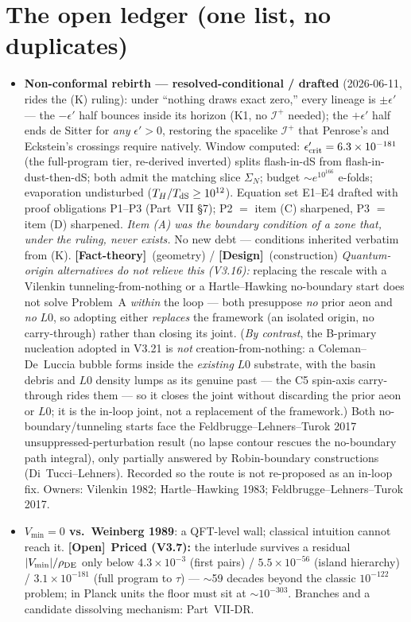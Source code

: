 \documentclass[11pt]{article}
\newcommand{\factth}{\textcolor{green!40!black}{\textbf{[Fact-theory]}}}
\newcommand{\design}{\textcolor{blue!60!black}{\textbf{[Design]}}}
\newcommand{\open}{\textcolor{red!70!black}{\textbf{[Open]}}}
\begin{document}
\section{The open ledger (one list, no duplicates)}
\begin{itemize}[leftmargin=2.6em,itemsep=3pt]
\item[\textbf{(A)}] \textbf{Non-conformal rebirth --- resolved-conditional / drafted} (2026-06-11, rides the (K) ruling): under ``nothing draws exact zero,'' every lineage is $\pm\epsilon'$ --- the $-\epsilon'$ half bounces inside its horizon (K1, no $\mathscr I^+$ needed); the $+\epsilon'$ half ends de Sitter for \emph{any} $\epsilon'>0$, restoring the spacelike $\mathscr I^+$ that Penrose's and Eckstein's crossings require natively. Window computed: $\epsilon'_{\rm crit}=6.3\times10^{-181}$ (the full-program tier, re-derived inverted) splits flash-in-dS from flash-in-dust-then-dS; both admit the matching slice $\Sigma_N$; budget $\sim e^{10^{166}}$ e-folds; evaporation undisturbed ($T_H/T_{\rm dS}\ge10^{12}$). Equation set E1--E4 drafted with proof obligations P1--P3 (Part~VII \S7); P2 $=$ item (C) sharpened, P3 $=$ item (D) sharpened. \emph{Item (A) was the boundary condition of a zone that, under the ruling, never exists.} No new debt --- conditions inherited verbatim from (K). \factth\ (geometry) / \design\ (construction) \emph{Quantum-origin alternatives do not relieve this (V3.16):} replacing the rescale with a Vilenkin tunneling-from-nothing or a Hartle--Hawking no-boundary start does not solve Problem~A \emph{within} the loop --- both presuppose \emph{no} prior aeon and \emph{no} $L0$, so adopting either \emph{replaces} the framework (an isolated origin, no carry-through) rather than closing its joint. (\emph{By contrast}, the B-primary nucleation adopted in V3.21 is \emph{not} creation-from-nothing: a Coleman--De~Luccia bubble forms inside the \emph{existing} $L0$ substrate, with the basin debris and $L0$ density lumps as its genuine past --- the C5 spin-axis carry-through rides them --- so it closes the joint without discarding the prior aeon or $L0$; it is the in-loop joint, not a replacement of the framework.) Both no-boundary/tunneling starts face the Feldbrugge--Lehners--Turok 2017 unsuppressed-perturbation result (no lapse contour rescues the no-boundary path integral), only partially answered by Robin-boundary constructions (Di~Tucci--Lehners). Recorded so the route is not re-proposed as an in-loop fix. Owners: Vilenkin 1982; Hartle--Hawking 1983; Feldbrugge--Lehners--Turok 2017.
\item[\textbf{(B)}] \textbf{$V_{\min}=0$ vs.\ Weinberg 1989}: a QFT-level wall; classical intuition cannot reach it. \open\ \textbf{Priced (V3.7):} the interlude survives a residual $|V_{\min}|/\rho_{\rm DE}$ only below $4.3\times10^{-3}$ (first pairs) / $5.5\times10^{-56}$ (island hierarchy) / $3.1\times10^{-181}$ (full program to $\tau$) --- $\sim$59 decades beyond the classic $10^{-122}$ problem; in Planck units the floor must sit at $\sim10^{-303}$. Branches and a candidate dissolving mechanism: Part~VII-DR.

\end{itemize}
\end{document}
